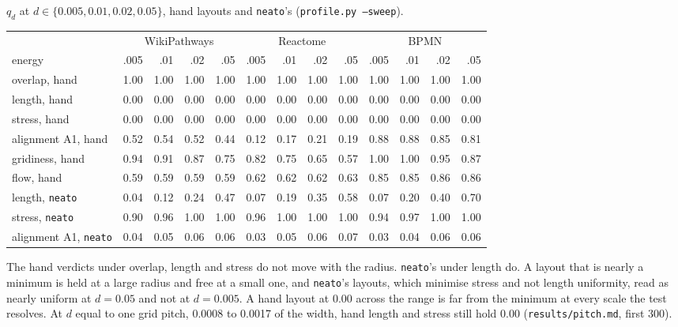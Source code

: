 \documentclass[11pt]{article}
\begin{document}
$q_d$ at $d \in \{0.005, 0.01, 0.02, 0.05\}$, hand layouts and \texttt{neato}'s
(\texttt{profile.py --sweep}).

\begin{center}\footnotesize
\begin{tabular}{lrrrrrrrrrrrr}
\toprule
 & \multicolumn{4}{c}{WikiPathways} & \multicolumn{4}{c}{Reactome} & \multicolumn{4}{c}{BPMN} \\
energy & .005 & .01 & .02 & .05 & .005 & .01 & .02 & .05 & .005 & .01 & .02 & .05 \\
\midrule
overlap, hand & 1.00 & 1.00 & 1.00 & 1.00 & 1.00 & 1.00 & 1.00 & 1.00 & 1.00 & 1.00 & 1.00 & 1.00 \\
length, hand & 0.00 & 0.00 & 0.00 & 0.00 & 0.00 & 0.00 & 0.00 & 0.00 & 0.00 & 0.00 & 0.00 & 0.00 \\
stress, hand & 0.00 & 0.00 & 0.00 & 0.00 & 0.00 & 0.00 & 0.00 & 0.00 & 0.00 & 0.00 & 0.00 & 0.00 \\
alignment A1, hand & 0.52 & 0.54 & 0.52 & 0.44 & 0.12 & 0.17 & 0.21 & 0.19 & 0.88 & 0.88 & 0.85 & 0.81 \\
gridiness, hand & 0.94 & 0.91 & 0.87 & 0.75 & 0.82 & 0.75 & 0.65 & 0.57 & 1.00 & 1.00 & 0.95 & 0.87 \\
flow, hand & 0.59 & 0.59 & 0.59 & 0.59 & 0.62 & 0.62 & 0.62 & 0.63 & 0.85 & 0.85 & 0.86 & 0.86 \\
\midrule
length, \texttt{neato} & 0.04 & 0.12 & 0.24 & 0.47 & 0.07 & 0.19 & 0.35 & 0.58 & 0.07 & 0.20 & 0.40 & 0.70 \\
stress, \texttt{neato} & 0.90 & 0.96 & 1.00 & 1.00 & 0.96 & 1.00 & 1.00 & 1.00 & 0.94 & 0.97 & 1.00 & 1.00 \\
alignment A1, \texttt{neato} & 0.04 & 0.05 & 0.06 & 0.06 & 0.03 & 0.05 & 0.06 & 0.07 & 0.03 & 0.04 & 0.06 & 0.06 \\
\bottomrule
\end{tabular}
\end{center}

The hand verdicts under overlap, length and stress do not move with the radius. \texttt{neato}'s under length do. A layout that is nearly a minimum is held at a large radius and free at a small one, and
\texttt{neato}'s layouts, which minimise stress and not length uniformity, read as nearly
uniform at $d = 0.05$ and not at $d = 0.005$. A hand layout at 0.00 across the range is
far from the minimum at every scale the test resolves. At $d$ equal to one grid pitch,
0.0008 to 0.0017 of the width, hand length and stress still hold 0.00
(\texttt{results/pitch.md}, first 300).
\end{document}
